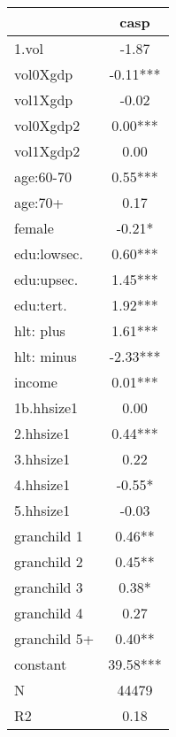 {
\def\sym#1{\ifmmode^{#1}\else\(^{#1}\)\fi}
\begin{tabular}{l*{1}{c}}
\hline\hline
            &\multicolumn{1}{c}{casp}\\
\hline
1.vol       &       -1.87   \\
vol0Xgdp    &       -0.11***\\
vol1Xgdp    &       -0.02   \\
vol0Xgdp2   &        0.00***\\
vol1Xgdp2   &        0.00   \\
age:60-70   &        0.55***\\
age:70+     &        0.17   \\
female      &       -0.21*  \\
edu:lowsec. &        0.60***\\
edu:upsec.  &        1.45***\\
edu:tert.   &        1.92***\\
hlt: plus   &        1.61***\\
hlt: minus  &       -2.33***\\
income      &        0.01***\\
1b.hhsize1  &        0.00   \\
2.hhsize1   &        0.44***\\
3.hhsize1   &        0.22   \\
4.hhsize1   &       -0.55*  \\
5.hhsize1   &       -0.03   \\
granchild 1 &        0.46** \\
granchild 2 &        0.45** \\
granchild 3 &        0.38*  \\
granchild 4 &        0.27   \\
granchild 5+&        0.40** \\
constant    &       39.58***\\
\hline
N           &       44479   \\
R2          &        0.18   \\
\hline\hline
\end{tabular}
}
